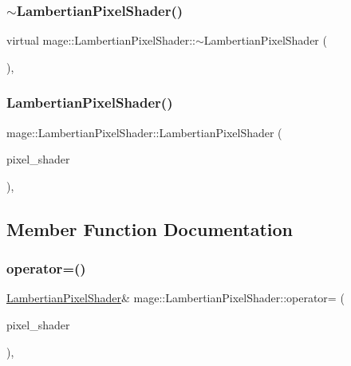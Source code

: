 \subsubsection{\texorpdfstring{$\sim$\+Lambertian\+Pixel\+Shader()}{~LambertianPixelShader()}}
{\footnotesize\ttfamily virtual mage\+::\+Lambertian\+Pixel\+Shader\+::$\sim$\+Lambertian\+Pixel\+Shader (\begin{DoxyParamCaption}{ }\end{DoxyParamCaption})\hspace{0.3cm}{\ttfamily [virtual]}, {\ttfamily [default]}}

\hypertarget{classmage_1_1_lambertian_pixel_shader_a0e7a36645bb7e1fa9bd481575886ddad}{}\label{classmage_1_1_lambertian_pixel_shader_a0e7a36645bb7e1fa9bd481575886ddad} 
\subsubsection{\texorpdfstring{Lambertian\+Pixel\+Shader()}{LambertianPixelShader()}\hspace{0.1cm}{\footnotesize\ttfamily [2/2]}}
{\footnotesize\ttfamily mage\+::\+Lambertian\+Pixel\+Shader\+::\+Lambertian\+Pixel\+Shader (\begin{DoxyParamCaption}\item[{const \hyperlink{classmage_1_1_lambertian_pixel_shader}{Lambertian\+Pixel\+Shader} \&}]{pixel\+\_\+shader }\end{DoxyParamCaption})\hspace{0.3cm}{\ttfamily [private]}, {\ttfamily [delete]}}



\subsection{Member Function Documentation}
\hypertarget{classmage_1_1_lambertian_pixel_shader_a03ae64ef13e62b33c6b6ac306207a045}{}\label{classmage_1_1_lambertian_pixel_shader_a03ae64ef13e62b33c6b6ac306207a045} 
\subsubsection{\texorpdfstring{operator=()}{operator=()}}
{\footnotesize\ttfamily \hyperlink{classmage_1_1_lambertian_pixel_shader}{Lambertian\+Pixel\+Shader}\& mage\+::\+Lambertian\+Pixel\+Shader\+::operator= (\begin{DoxyParamCaption}\item[{const \hyperlink{classmage_1_1_lambertian_pixel_shader}{Lambertian\+Pixel\+Shader} \&}]{pixel\+\_\+shader }\end{DoxyParamCaption})\hspace{0.3cm}{\ttfamily [private]}, {\ttfamily [delete]}}

